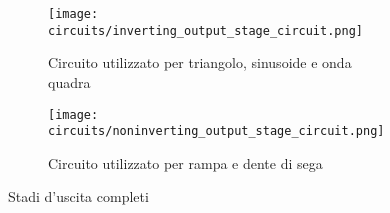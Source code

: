 \begin{figure}[H]
    \centering

    \begin{subfigure}{\textwidth}
        \centering
        \texttt{[image: circuits/inverting\_output\_stage\_circuit.png]}
        \caption{Circuito utilizzato per triangolo, sinusoide e onda quadra}
        \label{inverting_output_stage_circuit}
    \end{subfigure}
    \begin{subfigure}{\textwidth}
        \centering
        \texttt{[image: circuits/noninverting\_output\_stage\_circuit.png]}
        \caption{Circuito utilizzato per rampa e dente di sega}
        \label{noninverting_output_stage_circuit}
    \end{subfigure}

    \caption{Stadi d'uscita completi}
    \label{output_stages}
\end{figure}

